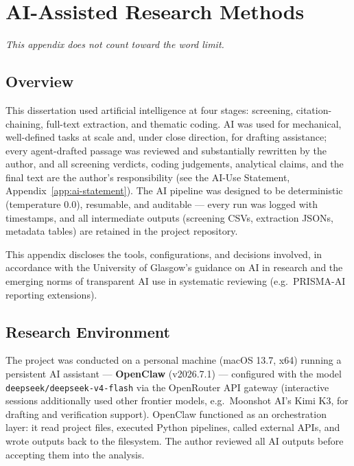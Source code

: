 \chapter{AI-Assisted Research Methods}
\label{app:ai-methods}

\emph{This appendix does not count toward the word limit.}

\section{Overview}

This dissertation used artificial intelligence at four stages: screening, citation-chaining, full-text extraction, and thematic coding. AI was used for mechanical, well-defined tasks at scale and, under close direction, for drafting assistance; every agent-drafted passage was reviewed and substantially rewritten by the author, and all screening verdicts, coding judgements, analytical claims, and the final text are the author's responsibility (see the AI-Use Statement, Appendix~\ref{app:ai-statement}). The AI pipeline was designed to be deterministic (temperature 0.0), resumable, and auditable --- every run was logged with timestamps, and all intermediate outputs (screening CSVs, extraction JSONs, metadata tables) are retained in the project repository.

This appendix discloses the tools, configurations, and decisions involved, in accordance with the University of Glasgow's guidance on AI in research and the emerging norms of transparent AI use in systematic reviewing (e.g.\ PRISMA-AI reporting extensions).

\section{Research Environment}

The project was conducted on a personal machine (macOS 13.7, x64) running a persistent AI assistant --- \textbf{OpenClaw} (v2026.7.1) --- configured with the model \texttt{deepseek/deepseek-v4-flash} via the OpenRouter API gateway (interactive sessions additionally used other frontier models, e.g.\ Moonshot AI's Kimi K3, for drafting and verification support). OpenClaw functioned as an orchestration layer: it read project files, executed Python pipelines, called external APIs, and wrote outputs back to the filesystem. The author reviewed all AI outputs before accepting them into the analysis.

